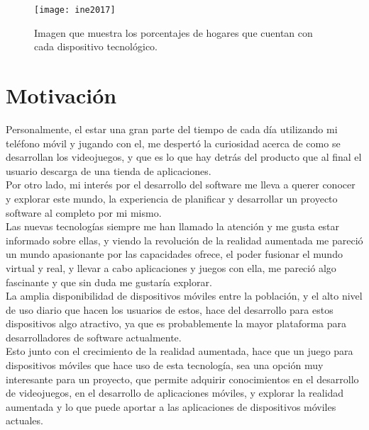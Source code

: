 \begin{figure}[h]
  \centering
  \texttt{[image: ine2017]}
  \caption{Imagen que muestra los porcentajes de hogares que cuentan con cada dispositivo tecnológico.\protect\footnotemark}
  \label{figura-ine}
\end{figure}


\newpage

\section{Motivación}
Personalmente, el estar una gran parte del tiempo de cada día utilizando mi teléfono móvil y jugando con el, me despertó la curiosidad acerca de como se desarrollan los videojuegos, y que es lo que hay detrás del producto que al final el usuario descarga de una tienda de aplicaciones.\\

Por otro lado, mi interés por el desarrollo del software me lleva a querer conocer y explorar este mundo, la experiencia de planificar y desarrollar un proyecto software al completo por mi mismo.\\

Las nuevas tecnologías siempre me han llamado la atención y me gusta estar informado sobre ellas, y viendo la revolución de la realidad aumentada me pareció un mundo apasionante por las capacidades ofrece, el poder fusionar el mundo virtual y real, y llevar a cabo aplicaciones y juegos con ella, me pareció algo fascinante y que sin duda me gustaría explorar.\\

La amplia disponibilidad de dispositivos móviles entre la población, y el alto nivel de uso diario que hacen los usuarios de estos, hace del desarrollo para estos dispositivos algo atractivo, ya que es probablemente la mayor plataforma para desarrolladores de software actualmente.\\

Esto junto con el crecimiento de la realidad aumentada, hace que un juego para dispositivos móviles que hace uso de esta tecnología, sea una opción muy interesante para un proyecto, que permite adquirir conocimientos en el desarrollo de videojuegos, en el desarrollo de aplicaciones móviles, y explorar la realidad aumentada y lo que puede aportar a las aplicaciones de dispositivos móviles actuales.

